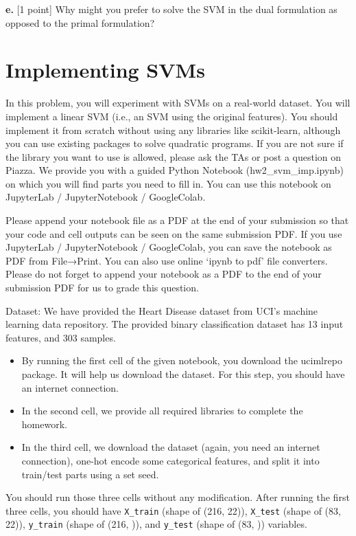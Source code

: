\documentclass[a3paper,12pt]{extarticle} %
\begin{document}
\noindent \textbf{e.} [1 point] Why might you prefer to solve the SVM in the dual formulation as opposed to the primal formulation?

\newpage
\section {Implementing SVMs}

In this problem, you will experiment with SVMs on a real-world dataset. You will implement a linear SVM (i.e., an SVM using the original features). You should implement it from scratch without using any libraries like scikit-learn, although you can use existing packages to solve quadratic programs. If you are not sure if the library you want to use is allowed, please ask the TAs or post a question on Piazza. We provide you with a guided Python Notebook (hw2\_svm\_imp.ipynb) on which you will find parts you need to fill in. You can use this notebook on JupyterLab / JupyterNotebook / GoogleColab.

Please append your notebook file as a PDF at the end of your submission so that your code and cell outputs can be seen on the same submission PDF. If you use JupyterLab / JupyterNotebook / GoogleColab, you can save the notebook as PDF from File→Print. You can also use online ‘ipynb to pdf’ file converters. Please do not forget to append your notebook as a PDF to the end of your submission PDF for us to grade this question.

Dataset: We have provided the Heart Disease dataset from UCI’s machine learning data repository. The provided binary classification dataset has 13 input features, and 303 samples.

\begin{itemize}
    \item By running the first cell of the given notebook, you download the ucimlrepo package. It will help us download the dataset. For this step, you should have an internet connection.
    \item In the second cell, we provide all required libraries to complete the homework.
    \item In the third cell, we download the dataset (again, you need an internet connection), one-hot encode some categorical features, and split it into train/test parts using a set seed.
\end{itemize}

You should run those three cells without any modification. After running the first three cells, you should have \texttt{X\_train} (shape of (216, 22)), \texttt{X\_test} (shape of (83, 22)), \texttt{y\_train} (shape of (216, )), and \texttt{y\_test} (shape of (83, )) variables.
\end{document}
